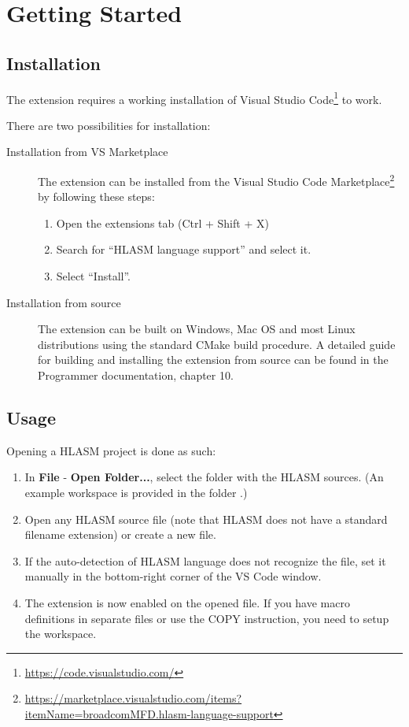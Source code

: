 \section{Getting Started}
\label{sec:start}

\subsection{Installation}

The extension requires a working installation of Visual Studio Code\footnote{\url{https://code.visualstudio.com/}} to work.

There are two possibilities for installation:
\begin{description}
	\item[Installation from VS Marketplace]
	The extension can be installed from the Visual Studio Code Marketplace\footnote{\url{https://marketplace.visualstudio.com/items?itemName=broadcomMFD.hlasm-language-support}} by following these steps:
	\begin{enumerate}
		\item Open the extensions tab (Ctrl + Shift + X)
		\item Search for ``HLASM language support'' and select it.
		\item Select ``Install''.
	\end{enumerate}
	\item[Installation from source]
	The extension can be built on Windows, Mac OS and most Linux distributions using the standard CMake build procedure. A detailed guide for building and installing the extension from source can be found in the Programmer documentation, chapter 10.
\end{description}

\subsection{Usage}

Opening a HLASM project is done as such:

\begin{enumerate}
	\item In \textbf{File} - \textbf{Open Folder...}, select the folder with the HLASM sources.
		(An example workspace is provided in the folder .)
	\item Open any HLASM source file (note that HLASM does not have a standard filename extension) or create a new file.
	\item If the auto-detection of HLASM language does not recognize the file, set it manually in the bottom-right corner of the VS Code window.  
	\item The extension is now enabled on the opened file. If you have macro definitions in separate files or use the COPY instruction, you need to setup the workspace.
\end{enumerate}

